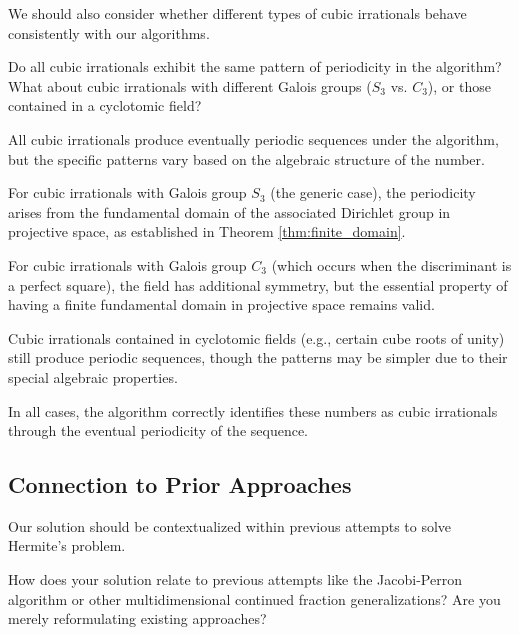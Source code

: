 We should also consider whether different types of cubic irrationals behave consistently with our algorithms.

\begin{objection}
Do all cubic irrationals exhibit the same pattern of periodicity in the \HAPD{} algorithm? What about cubic irrationals with different Galois groups ($S_3$ vs. $C_3$), or those contained in a cyclotomic field?
\end{objection}

\begin{response}
All cubic irrationals produce eventually periodic sequences under the \HAPD{} algorithm, but the specific patterns vary based on the algebraic structure of the number.

For cubic irrationals with Galois group $S_3$ (the generic case), the periodicity arises from the fundamental domain of the associated Dirichlet group in projective space, as established in Theorem \ref{thm:finite_domain}.

For cubic irrationals with Galois group $C_3$ (which occurs when the discriminant is a perfect square), the field has additional symmetry, but the essential property of having a finite fundamental domain in projective space remains valid.

Cubic irrationals contained in cyclotomic fields (e.g., certain cube roots of unity) still produce periodic sequences, though the patterns may be simpler due to their special algebraic properties.

In all cases, the \HAPD{} algorithm correctly identifies these numbers as cubic irrationals through the eventual periodicity of the sequence.
\end{response}

\subsection{Connection to Prior Approaches}

Our solution should be contextualized within previous attempts to solve Hermite's problem.

\begin{objection}
How does your solution relate to previous attempts like the Jacobi-Perron algorithm \cite{Perron1907} or other multidimensional continued fraction generalizations? Are you merely reformulating existing approaches?
\end{objection}

